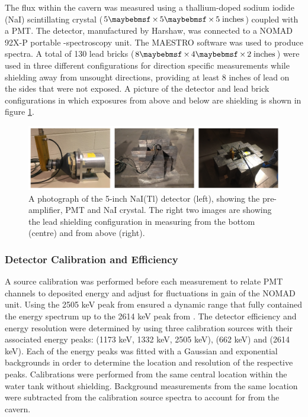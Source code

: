 The \gray{} flux within the cavern was measured using a thallium-doped sodium iodide (NaI) scintillating crystal ($5 \times 5 \times 5 \; \MathText{inches}$) coupled with a PMT. The detector, manufactured by Harshaw, was connected to a NOMAD 92X-P portable \gray{}-spectroscopy unit. The MAESTRO software was used to produce spectra. A total of 130 lead bricks ($8 \times 4 \times 2 \; \MathText{inches}$) were used in three different configurations for direction specific measurements while shielding away \grays{} from unsought directions, providing at least 8 inches of lead on the sides that were not exposed. A picture of the detector and lead brick configurations in which exposures from above and below are shielding is shown in figure \ref{fig:detector_and_shielding}.
%
\begin{figure}[]
    \centering
    \includegraphics[scale=0.75]{Chapter_3/Figures/Davis_detector_shielding.png}
    \caption[Diagram of the NaI(Tl) crystal detector and the lead shielding used in taking direction specific measurements.]
    {A photograph of the 5-inch NaI(Tl) detector (left), showing the pre-amplifier, PMT and NaI crystal. The right two images are showing the lead shielding configuration in measuring \grays{} from the bottom (centre) and from above (right).}
    \label{fig:detector_and_shielding}
\end{figure}
%

\subsubsection{Detector Calibration and Efficiency}
\label{secsec:calibration_efficiency}


A \CoSZ{} source calibration was performed before each measurement to relate PMT channels to deposited energy and adjust for fluctuations in gain of the NOMAD unit.
Using the 2505 keV peak from \CoSZ{} ensured a dynamic range that fully contained the energy spectrum up to the 2614 keV peak from \TlTZE{}. The detector efficiency and energy resolution were determined by using three calibration sources with their associated energy peaks: \CoSZ{} (1173 keV, 1332 keV, 2505 keV), \CsOTS{} (662 keV) and \TlTZE{} (2614 keV). Each of the energy peaks was fitted with a Gaussian and exponential backgrounds in order to determine the location and resolution of the respective peaks. Calibrations were performed from the same central location within the water tank without shielding. Background measurements from the same location were subtracted from the calibration source spectra to account for \grays{} from the cavern. 

